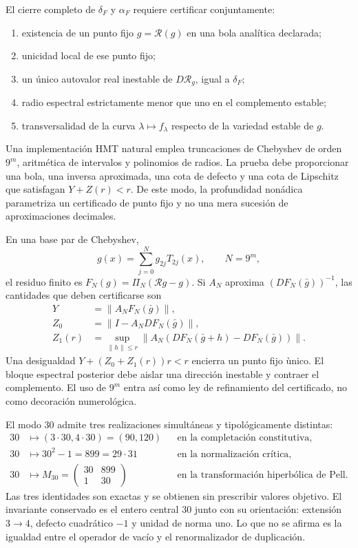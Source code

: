 El cierre completo de \(\delta_F\) y \(\alpha_F\) requiere certificar conjuntamente:

\begin{enumerate}
\item existencia de un punto fijo \(g=\mathcal R(g)\) en una bola anal\'itica declarada;
\item unicidad local de ese punto fijo;
\item un único autovalor real inestable de \(D\mathcal R_g\), igual a \(\delta_F\);
\item radio espectral estrictamente menor que uno en el complemento estable;
\item transversalidad de la curva \(\lambda\mapsto f_\lambda\) respecto de la variedad estable de \(g\).
\end{enumerate}

Una implementaci\'on HMT natural emplea truncaciones de Chebyshev de orden
\(9^m\), aritm\'etica de intervalos y polinomios de radios. La prueba debe
proporcionar una bola, una inversa aproximada, una cota de defecto y una cota
de Lipschitz que satisfagan \(Y+Z(r)<r\). De este modo, la profundidad
non\'adica parametriza un certificado de punto fijo y no una mera sucesi\'on
de aproximaciones decimales.

En una base par de Chebyshev,
\[
g(x)=\sum_{j=0}^{N}g_{2j}T_{2j}(x),\qquad N=9^m,
\]
el residuo finito es \(F_N(g)=\Pi_N(\mathcal Rg-g)\). Si \(A_N\) aproxima
\((DF_N(\bar g))^{-1}\), las cantidades que deben certificarse son
\begin{align*}
Y&=\|A_NF_N(\bar g)\|,\\
Z_0&=\|I-A_NDF_N(\bar g)\|,\\
Z_1(r)&=\sup_{\|h\|\le r}
\|A_N(DF_N(\bar g+h)-DF_N(\bar g))\|.
\end{align*}
Una desigualdad
\(Y+(Z_0+Z_1(r))r<r\) encierra un punto fijo \`unico. El bloque espectral
posterior debe aislar una direcci\'on inestable y contraer el complemento. El
uso de \(9^m\) entra as\'i como ley de refinamiento del certificado, no como
decoraci\'on numerol\'ogica.

\begin{corollary}
El modo \(30\) admite tres realizaciones simult\'aneas y tipol\'ogicamente
distintas:
\begin{align*}
30&\longmapsto(3\cdot30,4\cdot30)=(90,120)
&&\text{en la completaci\'on constitutiva},\\
30&\longmapsto30^2-1=899=29\cdot31
&&\text{en la normalizaci\'on cr\'itica},\\
30&\longmapsto
M_{30}=\begin{pmatrix}30&899\\1&30\end{pmatrix}
&&\text{en la transformaci\'on hiperb\'olica de Pell}.
\end{align*}
Las tres identidades son exactas y se obtienen sin prescribir valores objetivo. El invariante conservado es
el entero central \(30\) junto con su orientaci\'on: extensi\'on \(3\to4\),
defecto cuadr\'atico \(-1\) y unidad de norma uno. Lo que no se afirma es la
igualdad entre el operador de vac\'io y el renormalizador de duplicaci\'on.
\end{corollary}

